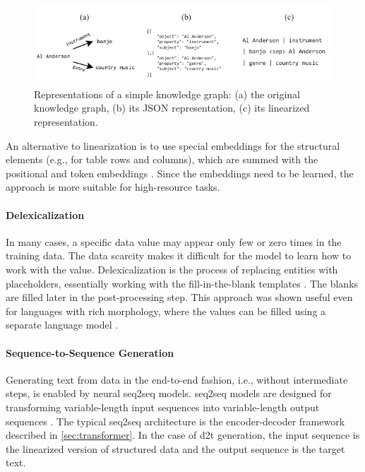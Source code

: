 {\begin{figure}[h]
  \centering
  \includegraphics[width=\textwidth]{img/linearization.pdf}

  \caption{Representations of a simple knowledge graph: (a) the original knowledge graph, (b) its JSON representation, (c) its linearized representation.}\label{fig:linearization}

\end{figure}

An alternative to linearization is to use special embeddings for the structural elements (e.g., for table rows and columns), which are summed with the positional and token embeddings \cite{wang2021tuta,yangTableFormerRobustTransformer2022}. Since the embeddings need to be learned, the approach is more suitable for high-resource tasks.

\paragraph{Delexicalization} In many cases, a specific data value may appear only few or zero times in the training data. The data scarcity makes it difficult for the model to learn how to work with the value. Delexicalization is the process of replacing entities with placeholders, essentially working with the fill-in-the-blank templates \cite{oh2000stochastic,mairesse2010phrase,wen2015semantically,dusekSequencetoSequenceGenerationSpoken2016}.  The blanks are filled later in the post-processing step. This approach was shown useful even for languages with rich morphology, where the values can be filled using a separate language model \cite{duvsek2019neural}.

\paragraph{Sequence-to-Sequence Generation} Generating text from data in the end-to-end fashion, i.e., without intermediate steps, is enabled by neural \ac{seq2seq} models. \Ac{seq2seq} models are designed for transforming variable-length input sequences into variable-length output sequences \cite{cho2014learning,sutskever2014sequence}. The typical \ac{seq2seq} architecture is the encoder-decoder framework described in \autoref{sec:transformer}. In the case of \ac{d2t} generation, the input sequence is the linearized version of structured data and the output sequence is the target text.

}
